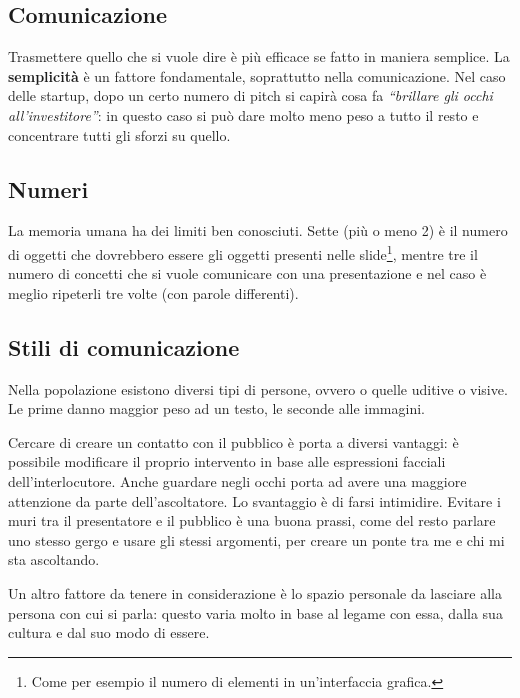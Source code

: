 \subsection{Comunicazione}

Trasmettere quello che si vuole dire è più efficace se fatto in maniera
semplice. La \textbf{semplicità} è un fattore fondamentale, soprattutto nella
comunicazione. Nel caso delle startup, dopo un certo numero di pitch si capirà
cosa fa \emph{``brillare gli occhi all'investitore''}: in questo caso si può dare
molto meno peso a tutto il resto e concentrare tutti gli sforzi su quello.

\subsection{Numeri}

La memoria umana ha dei limiti ben conosciuti. Sette (più o meno 2) è il numero
di oggetti che dovrebbero essere gli oggetti presenti nelle slide\footnote{Come
per esempio il numero di elementi in un'interfaccia grafica.}, mentre tre il
numero di concetti che si vuole comunicare con una presentazione e nel caso è
meglio ripeterli tre volte (con parole differenti).

\subsection{Stili di comunicazione}

Nella popolazione esistono diversi tipi di persone, ovvero o quelle uditive o
visive. Le prime danno maggior peso ad un testo, le seconde alle immagini.

Cercare di creare un contatto con il pubblico è porta a diversi vantaggi: è
possibile modificare il proprio intervento in base alle espressioni facciali
dell'interlocutore. Anche guardare negli occhi porta ad avere una maggiore
attenzione da parte dell'ascoltatore. Lo svantaggio è di farsi intimidire.
Evitare i muri tra il presentatore e il pubblico è una buona prassi, come del
resto parlare uno stesso gergo e usare gli stessi argomenti, per creare un
ponte tra me e chi mi sta ascoltando.

Un altro fattore da tenere in considerazione è lo spazio personale da lasciare
alla persona con cui si parla: questo varia molto in base al legame con essa,
dalla sua cultura e dal suo modo di essere.
